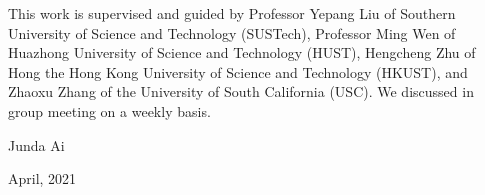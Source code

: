 \begin{thanks}

  This work is supervised and guided by Professor Yepang Liu of Southern University of Science and Technology (SUSTech), Professor Ming Wen of Huazhong University of Science and Technology (HUST), Hengcheng Zhu of Hong the Hong Kong University of Science and Technology (HKUST), and Zhaoxu Zhang of the University of South California (USC). We discussed in group meeting on a weekly basis.

\vskip 18pt

\begin{flushright}

Junda Ai

April, 2021

\end{flushright}

\end{thanks}

